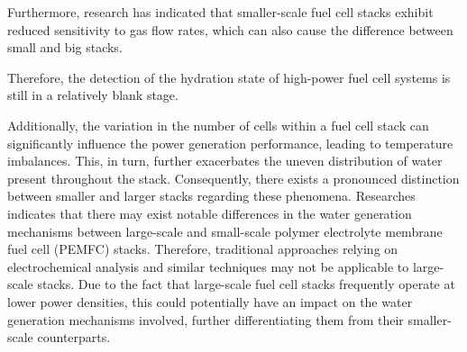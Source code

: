 \par
Furthermore, research has indicated that smaller-scale fuel cell stacks exhibit reduced sensitivity to gas flow rates\cite{bonnetDesign80kWePEM2008}, which can also cause the difference between small and big stacks.

Therefore, the detection of the hydration state of high-power fuel cell systems is still in a relatively blank stage.


\par
Additionally, the variation in the number of cells within a fuel cell stack can significantly influence the power generation performance, leading to temperature imbalances\cite{millerReviewPolymerElectrolyte2011}. This, in turn, further exacerbates the uneven distribution of water present throughout the stack. Consequently, there exists a pronounced distinction between smaller and larger stacks regarding these phenomena.
Researches indicates that there may exist notable differences in the water generation mechanisms between large-scale and small-scale polymer electrolyte membrane fuel cell (PEMFC) stacks\cite{jiReviewWaterManagement2009}. Therefore, traditional approaches relying on electrochemical analysis and similar techniques may not be applicable to large-scale stacks. Due to the fact that large-scale fuel cell stacks frequently operate at lower power densities\cite{shojayianSimulationCathodeCatalyst2024}, this could potentially have an impact on the water generation mechanisms involved, further differentiating them from their smaller-scale counterparts.

